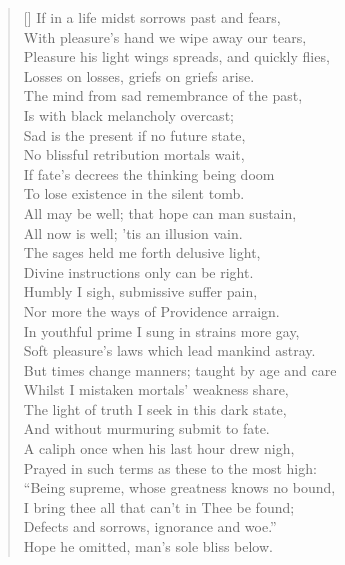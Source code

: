 \begin{verse}[\versewidth]
If in a life midst sorrows past and fears,\\
With pleasure's hand we wipe away our tears,\\
Pleasure his light wings spreads, and quickly flies,\\
Losses on losses, griefs on griefs arise.\\
The mind from sad remembrance of the past,\\
Is with black melancholy overcast;\\
Sad is the present if no future state,\\
No blissful retribution mortals wait,\\
If fate's decrees the thinking being doom\\
To lose existence in the silent tomb.\\
All may be well; that hope can man sustain,\\
All now is well; 'tis an illusion vain.\\
The sages held me forth delusive light,\\
Divine instructions only can be right.\\
Humbly I sigh, submissive suffer pain,\\
Nor more the ways of Providence arraign.\\
In youthful prime I sung in strains more gay,\\
Soft pleasure's laws which lead mankind astray.\\
But times change manners; taught by age and care\\
Whilst I mistaken mortals' weakness share,\\
The light of truth I seek in this dark state,\\
And without murmuring submit to fate.\\
A caliph once when his last hour drew nigh,\\
Prayed in such terms as these to the most high:\\
``Being supreme, whose greatness knows no bound,\\
I bring thee all that can't in Thee be found;\\
Defects and sorrows, ignorance and woe.''\\
Hope he omitted, man's sole bliss below.
\end{verse}

